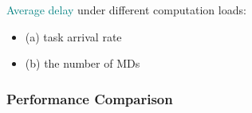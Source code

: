 \begin{frame}
\begin{figure}
	\end{figure}
	
	\textcolor{teal}{Average delay} under different computation loads:
	\begin{itemize}[]
		
		\item (a) task arrival rate
		
		\item (b) the number of MDs
		
	\end{itemize}
	
\end{frame}


\begin{frame}
	\frametitle{Performance Comparison}
	

\end{frame}
